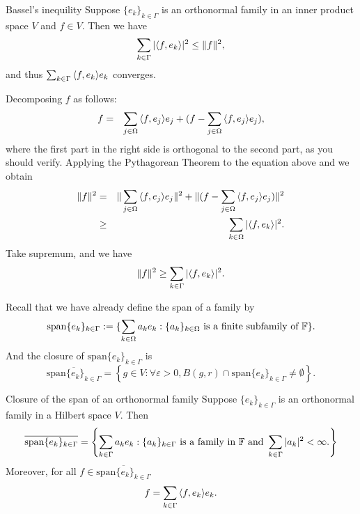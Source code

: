 \begin{stheorem}{Bassel's inequility}
Suppose $\{e_k\}_{k \in \Gamma}$ is an orthonormal family in an inner product space $V$ and $f \in V$. Then we have
$$
\sum_{k\in \Gamma}|{\langle f,e_k\rangle}|^2 \leq \Vert f \Vert^2,
$$
and thus $ \sum_{k \in \Gamma} {\langle f,e_k\rangle}e_k$ converges.
\end{stheorem}
\begin{Proof}
Decomposing $f$ as follows:
\begin{eqnarray*}
	f &=& \sum_{j \in \Omega}{\langle f,e_j\rangle}e_j + (f-\sum_{j \in \Omega}{\langle f,e_j\rangle}e_j),
\end{eqnarray*}
where  the first part in the right side is orthogonal to the second part, as you should verify.
Applying the Pythagorean Theorem to the equation above and we obtain
\begin{eqnarray*}
\Vert f\Vert^2 &=& \Vert\sum_{j \in \Omega}{\langle f,e_j\rangle}e_j \Vert^2 + \Vert(f-\sum_{j \in \Omega}{\langle f,e_j\rangle}e_j) \Vert^2 \\
&\geq& \sum_{k \in \Omega}|{\langle f,e_k\rangle}|^2.
\end{eqnarray*}
Take supremum, and we have
$$
\Vert f \Vert ^2 \geq \sum_{k \in \Gamma}|{\langle f,e_k\rangle}|^2.
$$
\end{Proof}
Recall that we have already define the span of a family by
$$
\mathrm{span}\{e_k\}_{k \in \Gamma} := \{\sum_{k \in \Omega}a_ke_k: \{a_k\}_{k \in \Omega} \ \text{is a finite subfamily of} \ \mathbb{F}\}.
$$
And the closure of $\mathrm{span}\{e_k\}_{k \in \Gamma}$ is 
$$
\overline{\mathrm{span}\{e_k\}_{k \in \Gamma}}=\left\{ g \in V: \forall \varepsilon>0, B(g,r)\cap \mathrm{span}\{e_k\}_{k \in \Gamma} \neq \emptyset \right\}.
$$
\begin{stheorem}{Closure of the span of an orthonormal family}{}
Suppose $\{e_k\}_{k \in \Gamma}$ is an orthonormal family in a Hilbert space $V$. Then 
$$
\overline{\mathrm{span}\{e_k\}_{k \in \Gamma}} = \left\{ \sum_{k \in \Gamma}a_ke_k: \{a_k\}_{k \in \Gamma} \ \text{is a family in} \ \F \ \text{and}\ \sum_{k \in \Gamma}|a_k|^2 < \infty. \right\}
$$
Moreover, for all $f \in \overline{\mathrm{span}\{e_k\}_{k \in \Gamma}} $
$$
f = \sum_{k \in \Gamma} {\langle f,e_k\rangle}e_k.
$$	
\end{stheorem}
